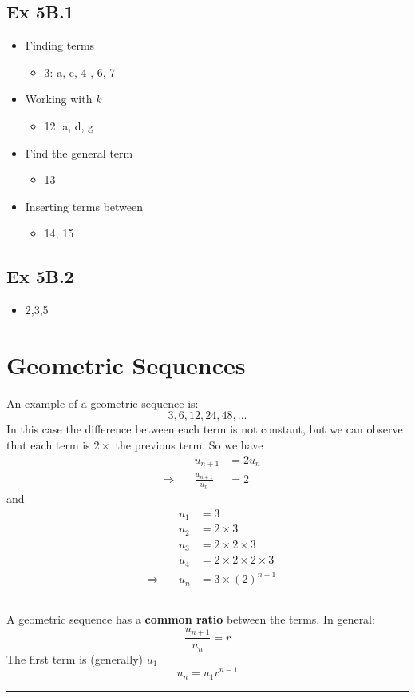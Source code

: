 \documentclass[12pt]{article}
\begin{document}
\subsection{Ex 5B.1}
\renewcommand{\labelitemii}{$\star$}
\begin{multicols}{4}
\begin{itemize}
	\item Finding terms 
	\begin{itemize}
		\item 3: a, e, 4 , 6, 7
	\end{itemize}
	\item Working with $k$
		\begin{itemize}
		\item 12: a, d, g
	\end{itemize}
		\item Find the general term
	\begin{itemize}
		\item 13
	\end{itemize}
	\item Inserting terms between
			\begin{itemize}
		\item 14, 15
	\end{itemize}
	
\end{itemize}
\end{multicols}
 
\subsection{Ex 5B.2}
\begin{itemize}
	\item 2,3,5
\end{itemize}
\newpage
\section{Geometric  Sequences}
An example of a geometric sequence is:
\LARGE $$3,6,12, 24, 48,...$$ \normalsize
In this case the difference between each term is not constant, but we can observe that each term is $2 \times$ the previous term.
So we have 
\begin{alignat*}{2}
&\qquad &u_{n+1} &= 2u_n\\
	&\Rightarrow& \frac{ u_{n+1} }{ u_n }&= 2
\end{alignat*}
and 
\begin{alignat*}{2}
	&\qquad &u_{1} &= 3\\
	&& u_2&= 2\times 3\\
	&& u_3&= 2\times 2\times 3\\
	&& u_4&=  2\times2\times 2\times 3\\
	&\Rightarrow&u_n&= 3\times(2)^{n-1}
\end{alignat*}
\hrule\vspace{0.5cm}
A geometric sequence has a \textbf{common ratio} between the terms.
In general:
$$\frac{ u_{n+1} }{ u_n } = r$$
The first term is (generally) $u_1$
\LARGE$$u_n = u_1 r^{n-1}$$\normalsize
\vspace{0.5cm}\hrule
\end{document}
